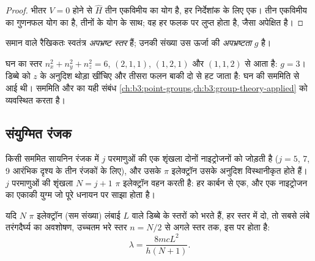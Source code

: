 \begin{proof}
भीतर $V = 0$ होने से $\hat H$ तीन एकविमीय  का योग है,
हर निर्देशांक के लिए एक। तीन एकविमीय  का गुणनफल योग का
 है, तीनों  के योग के साथ; वह हर फलक पर लुप्त
होता है, जैसा अपेक्षित है।
\end{proof}

\begin{definition}[अपभ्रष्ट स्तर]\label{def:b3:quantum-model-systems:degenerate}
समान  वाले रैखिकतः स्वतंत्र 
\emph{अपभ्रष्ट स्तर} हैं; उनकी संख्या उस ऊर्जा की
\emph{अपभ्रष्टता} $g$ है।
\end{definition}

\begin{example}\label{ex:b3:quantum-model-systems:cube}
घन का स्तर $n_x^2 + n_y^2 + n_z^2 = 6$, $(2,1,1)$,
$(1,2,1)$ और $(1,1,2)$ से आता है: $g = 3$। डिब्बे को $z$ के अनुदिश थोड़ा खींचिए और
तीसरा फलन बाकी दो से हट जाता है:  घन की सममिति से आई थी।
सममिति और  का यही संबंध
\cref{ch:b3:point-groups,ch:b3:group-theory-applied} को व्यवस्थित करता है।
\end{example}

\subsection*{संयुग्मित रंजक}

किसी सममित सायनिन रंजक में $j$ परमाणुओं की एक शृंखला दोनों नाइट्रोजनों को जोड़ती है
(\(j = 5\), 7, 9 आरंभिक दृश्य के तीन रंजकों के लिए), और उसके $\pi$ इलेक्ट्रॉन
उसके अनुदिश विस्थानीकृत होते हैं। $j$ परमाणुओं की शृंखला $N = j + 1$ $\pi$
इलेक्ट्रॉन वहन करती है: हर कार्बन से एक, और एक नाइट्रोजन का एकाकी युग्म जो
पूरे धनायन पर साझा होता है।

\begin{proposition}[मुक्त-इलेक्ट्रॉन अवशोषण तरंगदैर्घ्य]\label{prop:b3:quantum-model-systems:free-electron}
यदि $N$ $\pi$ इलेक्ट्रॉन (सम संख्या) लंबाई $L$ वाले डिब्बे के स्तरों को भरते हैं,
हर स्तर में दो, तो सबसे लंबे तरंगदैर्घ्य का अवशोषण, उच्चतम भरे
स्तर $n = N/2$ से अगले स्तर तक, इस पर होता है:
\[
\lambda = \frac{8mcL^2}{h(N+1)}.
\]
\end{proposition}

